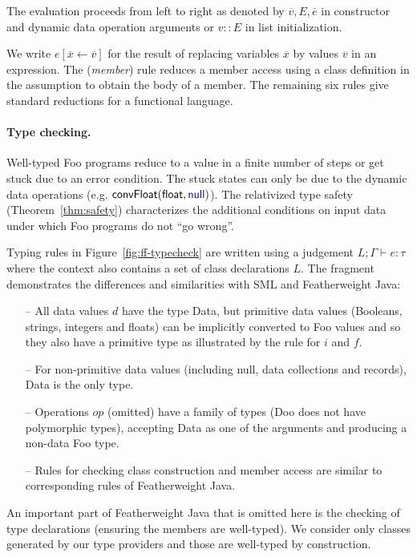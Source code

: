 \documentclass[10pt,preprint,blind,clearpagebib]{sigplanconf}
\newcommand{\kvd}[1]{\textnormal{\textcolor{kvdclr}{\sffamily #1}}}
\newcommand{\ident}[1]{\textnormal{\sffamily #1}}
\begin{document}
\noindent
The evaluation proceeds from left to right as denoted by $\overline{v}, E, \overline{e}$ in 
constructor and dynamic data operation arguments or $v::E$ in list initialization.

We write $e[\overline{x} \leftarrow \overline{v}]$ for the result of replacing variables $\overline{x}$ by
values $\overline{v}$ in an expression. The (\emph{member}) rule reduces a member access using a class 
definition in the assumption to obtain the body of a member. The remaining six rules
give standard reductions for a functional language.


\paragraph{Type checking.} 
Well-typed Foo programs reduce to a value in a finite number of steps or get stuck due to an
error condition. The stuck states can only be due to the dynamic data operations (e.g.
$\ident{convFloat}(\ident{float},\kvd{null})$). The relativized type safety (Theorem~\ref{thm:safety})
characterizes the additional conditions on input data under which Foo programs do not ``go wrong''.

Typing rules in Figure~\ref{fig:ff-typecheck} are written using a judgement
$L; \Gamma \vdash e : \tau$ where the context also contains a set of class declarations $L$.
The fragment demonstrates the differences and similarities with SML and Featherweight Java:
%
\begin{itemize}
\item[--] All data values $d$ have the type \ident{Data}, but primitive data values (Booleans, 
  strings, integers and floats) can be implicitly converted to Foo values and so they also have a 
  primitive type as illustrated by the rule for $i$ and $f$.
\item[--] For non-primitive data values (including \kvd{null}, data collections and records),
  \ident{Data} is the only type.
\item[--] Operations $op$ (omitted) have a family of types (Doo does not have polymorphic types),
  accepting \ident{Data} as one of the arguments and producing a non-data Foo type.
\item[--] Rules for checking class construction and member access are similar to corresponding
  rules of Featherweight Java.  
\end{itemize}
%
An important part of Featherweight Java that is omitted here is the checking of type declarations
(ensuring the members are well-typed). We consider only classes generated by our type providers 
and those are well-typed by construction.
\end{document}
